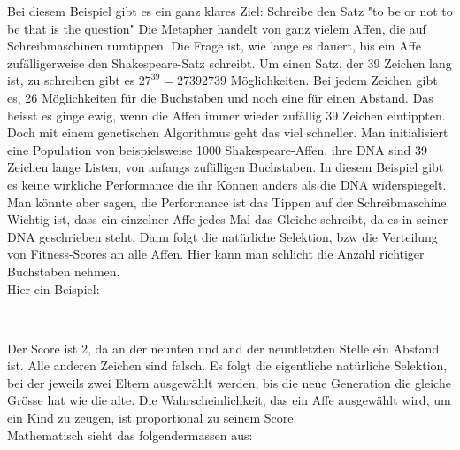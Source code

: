 \documentclass[10pt,a4paper,ngerman,english]{article}
\begin{document}
Bei diesem Beispiel gibt es ein ganz klares Ziel: Schreibe den Satz "to be or not to be that is the question" Die Metapher handelt von ganz vielem Affen, die auf Schreibmaschinen rumtippen. Die Frage ist, wie lange es dauert, bis ein Affe zufälligerweise den Shakespeare-Satz schreibt. Um einen Satz, der 39 Zeichen lang ist, zu schreiben gibt es $ 27^{39} = 27392739 $ Möglichkeiten. Bei jedem Zeichen gibt es, 26 Möglichkeiten für die Buchstaben und noch eine für einen Abstand. Das heisst es ginge ewig, wenn die Affen immer wieder zufällig 39 Zeichen eintippten. Doch mit einem genetischen Algorithmus geht das viel schneller. Man initialisiert eine Population von beispielsweise 1000 Shakespeare-Affen, ihre DNA sind 39 Zeichen lange Listen, von anfangs zufälligen Buchstaben. In diesem Beispiel gibt es keine wirkliche Performance die ihr Können anders als die DNA widerspiegelt. Man könnte aber sagen, die Performance ist das Tippen auf der Schreibmaschine. Wichtig ist, dass ein einzelner Affe jedes Mal das Gleiche schreibt, da es in seiner DNA geschrieben steht. Dann folgt die natürliche Selektion, bzw die Verteilung von Fitness-Scores an alle Affen. Hier kann man schlicht die Anzahl richtiger Buchstaben nehmen.\\

Hier ein Beispiel:\\

\begin{addmargin}[2em]{0em}
\\
\end{addmargin}

\setlength\parindent{0pt}
Der Score ist 2, da an der neunten und and der neuntletzten Stelle ein Abstand ist. Alle anderen Zeichen sind falsch. Es folgt die eigentliche natürliche Selektion, bei der jeweils zwei Eltern ausgewählt werden, bis die neue Generation die gleiche Grösse hat wie die alte. Die Wahrscheinlichkeit, das ein Affe ausgewählt wird, um ein Kind zu zeugen, ist proportional zu seinem Score.\\

Mathematisch sieht das folgendermassen aus:\\
\end{document}
